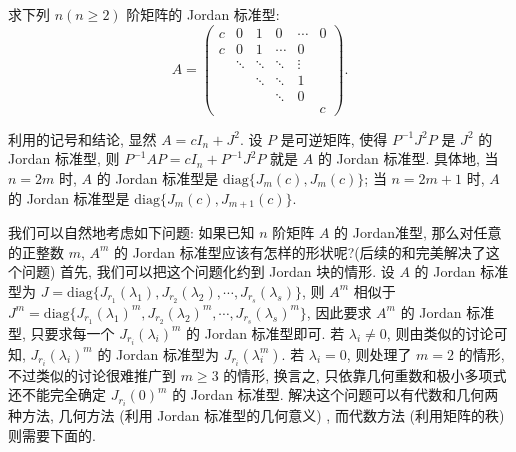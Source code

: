 \documentclass[../../main.tex]{subfiles}
\begin{document}
\begin{example}
求下列 $n(n \geqslant  2)$ 阶矩阵的 Jordan 标准型:
\[
A = \begin{pmatrix}
c & 0 & 1 & 0 & \cdots & 0 \\
c & 0 & 1 & \cdots & 0 \\
& \ddots & \ddots & \ddots & \vdots \\
& & \ddots & \ddots & 1 \\
& & & \ddots & 0 \\
& & & & & c
\end{pmatrix}.
\]
\end{example}
\begin{solution}
利用的记号和结论, 显然 $A = cI_n + J^2$. 设 $P$ 是可逆矩阵, 使得 $P^{-1}J^2P$ 是 $J^2$ 的 Jordan 标准型, 则 $P^{-1}AP = cI_n + P^{-1}J^2P$ 就是 $A$ 的 Jordan 标准型. 具体地, 当 $n = 2m$ 时, $A$ 的 Jordan 标准型是 $\mathrm{diag}\{J_m(c),J_m(c)\}$; 当 $n = 2m + 1$ 时, $A$ 的 Jordan 标准型是 $\mathrm{diag}\{J_m(c),J_{m + 1}(c)\}$.
\end{solution}

\vspace{0.5cm}

我们可以自然地考虑如下问题: 如果已知 $n$ 阶矩阵 $A$ 的 Jordan准型, 那么对任意的正整数 $m$, $A^m$ 的 Jordan 标准型应该有怎样的形状呢?(后续的和完美解决了这个问题) 首先, 我们可以把这个问题化约到 Jordan 块的情形. 设 $A$ 的 Jordan 标准型为 $J = \mathrm{diag}\{J_{r_1}(\lambda_1),J_{r_2}(\lambda_2),\cdots,J_{r_s}(\lambda_s)\}$, 则 $A^m$ 相似于 $J^m = \mathrm{diag}\{J_{r_1}(\lambda_1)^m,J_{r_2}(\lambda_2)^m,\cdots,J_{r_s}(\lambda_s)^m\}$, 因此要求 $A^m$ 的 Jordan 标准型, 只要求每一个 $J_{r_i}(\lambda_i)^m$ 的 Jordan 标准型即可. 若 $\lambda_i \neq 0$, 则由类似的讨论可知, $J_{r_i}(\lambda_i)^m$ 的 Jordan 标准型为 $J_{r_i}(\lambda_i^m)$. 若 $\lambda_i = 0$, 则处理了 $m = 2$ 的情形, 不过类似的讨论很难推广到 $m \geqslant  3$ 的情形, 换言之, 只依靠几何重数和极小多项式还不能完全确定 $J_{r_i}(0)^m$ 的 Jordan 标准型. 解决这个问题可以有代数和几何两种方法, 几何方法 (利用 Jordan 标准型的几何意义) , 而代数方法 (利用矩阵的秩) 则需要下面的.
\end{document}
